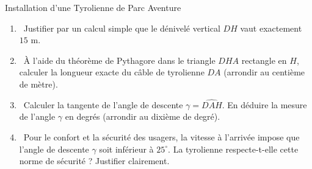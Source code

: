\begin{sujetdnb}{Installation d'une Tyrolienne de Parc Aventure}
\begin{enumerate}[leftmargin=1.5em, itemsep=3pt]
    \item \capSApproprier\ Justifier par un calcul simple que le dénivelé vertical $DH$ vaut exactement \textbf{$15\text{ m}$}. \pointille[3cm]
    \item \capRealiser\ À l'aide du théorème de Pythagore dans le triangle $DHA$ rectangle en $H$, calculer la longueur exacte du câble de tyrolienne $DA$ (arrondir au centième de mètre).
    \item \capRealiser\ Calculer la tangente de l'angle de descente $\gamma = \widehat{DAH}$. En déduire la mesure de l'angle $\gamma$ en degrés (arrondir au dixième de degré).
    \item \capValider\ Pour le confort et la sécurité des usagers, la vitesse à l'arrivée impose que l'angle de descente $\gamma$ soit inférieur à \textbf{$25^\circ$}. La tyrolienne respecte-t-elle cette norme de sécurité ? Justifier clairement.
\end{enumerate}

\vspace{3mm}
\lignesreponse[10]
\end{sujetdnb}

